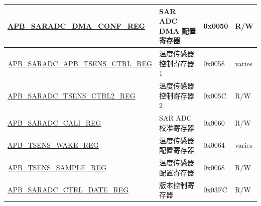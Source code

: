 \begin{longtable}{ | p{7cm} | p{5.2cm} | p{1.3cm} | p{1cm} | }
\hyperref[regdesc:APBSARADCDMACONFREG]{APB\_SARADC\_DMA\_CONF\_REG} & SAR ADC DMA 配置寄存器 & 0x0050 & R/W \\ \hline
\hyperref[regdesc:APBSARADCAPBTSENSCTRLREG]{APB\_SARADC\_APB\_TSENS\_CTRL\_REG} & 温度传感器控制寄存器 1 & 0x0058 & varies \\ \hline
\hyperref[regdesc:APBSARADCTSENSCTRL2REG]{APB\_SARADC\_TSENS\_CTRL2\_REG}  & 温度传感器控制寄存器 2 & 0x005C & R/W \\ \hline
\hyperref[regdesc:APBSARADCCALIREG]{APB\_SARADC\_CALI\_REG} & SAR ADC 校准寄存器 & 0x0060 & R/W \\ \hline
\hyperref[regdesc:APBTSENSWAKEREG]{APB\_TSENS\_WAKE\_REG} & 温度传感器配置寄存器 & 0x0064 & varies \\ \hline
\hyperref[regdesc:APBTSENSSAMPLEREG]{APB\_TSENS\_SAMPLE\_REG} & 温度传感器配置寄存器 & 0x0068 & R/W \\ \hline
\hyperref[regdesc:APBSARADCCTRLDATEREG]{APB\_SARADC\_CTRL\_DATE\_REG} & 版本控制寄存器 & 0x03FC & R/W \\ \hline
\end{longtable}
